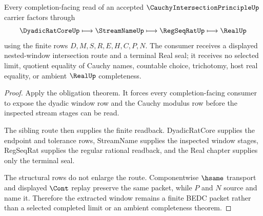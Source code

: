 \begin{theorem}
\label{thm:cauchy-intersection-principle-window-extraction}
Every completion-facing read of an accepted $\CauchyIntersectionPrincipleUp$ carrier factors through
$$
\DyadicRatCoreUp \longmapsto \StreamNameUp \longmapsto \RegSeqRatUp \longmapsto \RealUp
$$
using the finite rows $D,M,S,R,E,H,C,P,N$. The consumer receives a displayed nested-window intersection route and a terminal Real seal; it receives no selected limit, quotient equality of Cauchy names, countable choice, trichotomy, host real equality, or ambient $\RealUp$ completeness.
\end{theorem}
\begin{proof}
Apply the obligation theorem. It forces every completion-facing consumer to expose the dyadic window row and the Cauchy modulus row before the inspected stream stages can be read.

The sibling route then supplies the finite readback. DyadicRatCore supplies the endpoint and tolerance rows, StreamName supplies the inspected window stages, RegSeqRat supplies the regular rational readback, and the Real chapter supplies only the terminal seal.

The structural rows do not enlarge the route. Componentwise $\hsame$ transport and displayed $\Cont$ replay preserve the same packet, while $P$ and $N$ source and name it. Therefore the extracted window remains a finite BEDC packet rather than a selected completed limit or an ambient completeness theorem.
\end{proof}




